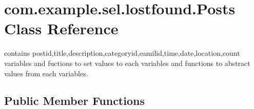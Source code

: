 \hypertarget{classcom_1_1example_1_1sel_1_1lostfound_1_1Posts}{}\section{com.\+example.\+sel.\+lostfound.\+Posts Class Reference}
\label{classcom_1_1example_1_1sel_1_1lostfound_1_1Posts}


contains postid,title,description,categoryid,eamilid,time,date,location,count variables and fuctions to set values to each variables and functions to abstract values from each variables.  


\subsection*{Public Member Functions}
